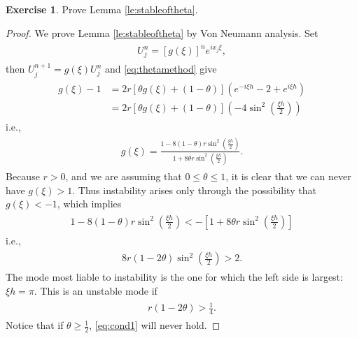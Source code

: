 \documentclass[a4paper,twoside]{ctexart}
\theoremstyle{definition}
\newtheorem{exercise}[definition]{Exercise}
\begin{document}
\begin{exercise}
	Prove Lemma \ref{le:stableoftheta}.
\end{exercise}

\begin{proof}
	We prove Lemma \ref{le:stableoftheta} by Von Neumann analysis. Set
	\begin{eqnarray}
	\begin{aligned}
	U_j^n = [g(\xi)]^n e^{ix_j\xi},
	\end{aligned}
	\end{eqnarray}
	then $U_j^{n+1} = g(\xi)U_j^n$ and \eqref{eq:thetamethod} give
	\begin{eqnarray}
	\begin{aligned}
	g(\xi) - 1 &= 2r[\theta g(\xi) + (1 - \theta)](e^{-i\xi h} - 2 + e^{i\xi h})\\
	&=2r[\theta g(\xi) + (1 - \theta)]\left(-4\sin^2{\left(\frac{\xi h}{2}\right)}\right)
	\end{aligned}
	\end{eqnarray}
	i.e.,
	\begin{eqnarray}
	\begin{aligned}
	g(\xi) = \frac{1-8(1-\theta)r\sin^2{\left(\frac{\xi h}{2}\right)}}{1+8\theta r \sin^2{\left(\frac{\xi h}{2}\right)}}.
	\end{aligned}
	\end{eqnarray}
	Because $r > 0$, and we are assuming that $0 \le \theta \le 1$, it is clear that we
	can never have $g(\xi) > 1$. Thus instability arises only through the possibility
	that $g(\xi) < −1$, which implies
	\begin{eqnarray}
	\begin{aligned}
	1-8(1-\theta)r\sin^2{\left(\frac{\xi h}{2}\right)} < -\left[1+8\theta r \sin^2{\left(\frac{\xi h}{2}\right)}\right]
	\end{aligned}
	\end{eqnarray}
	i.e.,
	\begin{eqnarray}
	\begin{aligned}
	8r(1-2\theta)\sin^2{\left(\frac{\xi h}{2}\right)} > 2.
	\end{aligned}
	\end{eqnarray}
	The mode most liable to instability is the one for which the left side is largest: $\xi h = \pi$. This is an unstable mode if
		\begin{eqnarray}
		\label{eq:cond1}
	\begin{aligned}
	r(1-2\theta) > \frac{1}{4}.
	\end{aligned}
	\end{eqnarray}
	Notice that if $\theta \ge \frac{1}{2}$, \eqref{eq:cond1} will never hold.
\end{proof}
\end{document}
